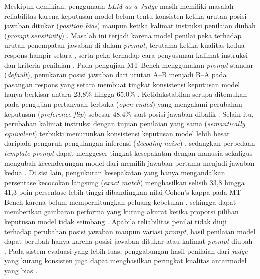Meskipun demikian, penggunaan \textit{LLM-as-a-Judge} masih memiliki masalah reliabilitas karena keputusan model belum tentu konsisten ketika urutan posisi jawaban ditukar (\textit{position bias}) \cite{zhengJudgingLLMasaJudgeMTBench2023}\cite{shiJudgingJudgesSystematic} maupun ketika kalimat instruksi penilaian diubah (\textit{prompt sensitivity}) \cite{weiSystematicEvaluationLLMasaJudge2025}\cite{bellibatluJudgeSenseBenchmarkPrompt2026}. Masalah ini terjadi karena model penilai peka terhadap urutan penempatan jawaban di dalam \textit{prompt}, terutama ketika kualitas kedua respons hampir setara \cite{liLLMsasJudgesComprehensiveSurvey2024}\cite{shiJudgingJudgesSystematic}, serta peka terhadap cara penyusunan kalimat instruksi dan kriteria penilaian \cite{weiSystematicEvaluationLLMasaJudge2025}\cite{bellibatluJudgeSenseBenchmarkPrompt2026}. Pada pengujian MT-Bench menggunakan \textit{prompt} standar (\textit{default}), penukaran posisi jawaban dari urutan A--B menjadi B--A pada pasangan respons yang setara membuat tingkat konsistensi keputusan model hanya berkisar antara 23,8\% hingga 65,0\% \cite{zhengJudgingLLMasaJudgeMTBench2023}. Ketidakstabilan serupa ditemukan pada pengujian pertanyaan terbuka (\textit{open-ended}) yang mengalami perubahan keputusan (\textit{preference flip}) sebesar 48,4\% saat posisi jawaban dibalik \cite{anghelDiagnosingBiasInstability2025}. Selain itu, perubahan kalimat instruksi dengan tujuan penilaian yang sama (\textit{semantically equivalent}) terbukti menurunkan konsistensi keputusan model lebih besar daripada pengaruh pengulangan inferensi (\textit{decoding noise}) \cite{bellibatluJudgeSenseBenchmarkPrompt2026}, sedangkan perbedaan \textit{template prompt} dapat menggeser tingkat kesepakatan dengan manusia sekaligus mengubah kecenderungan model dari memilih jawaban pertama menjadi jawaban kedua \cite{weiSystematicEvaluationLLMasaJudge2025}. Di sisi lain, pengukuran kesepakatan yang hanya mengandalkan persentase kecocokan langsung (\textit{exact match}) menghasilkan selisih 33,8 hingga 41,3 poin persentase lebih tinggi dibandingkan nilai Cohen's kappa pada MT-Bench karena belum memperhitungkan peluang kebetulan \cite{normanReliabilityValiditySystematic2026}, sehingga dapat memberikan gambaran performa yang kurang akurat ketika proporsi pilihan keputusan model tidak seimbang \cite{raoAgreementMetricsLLMasJudge2026}. Apabila reliabilitas penilai tidak diuji terhadap perubahan posisi jawaban maupun variasi \textit{prompt}, hasil penilaian model dapat berubah hanya karena posisi jawaban ditukar \cite{shiJudgingJudgesSystematic}\cite{normanReliabilityValiditySystematic2026} atau kalimat \textit{prompt} diubah \cite{weiSystematicEvaluationLLMasaJudge2025}\cite{bellibatluJudgeSenseBenchmarkPrompt2026}. Pada sistem evaluasi yang lebih luas, penggabungan hasil penilaian dari \textit{judge} yang kurang konsisten juga dapat menghasilkan peringkat kualitas antarmodel yang bias \cite{xuJudgeAwareRankingFramework2026}.

